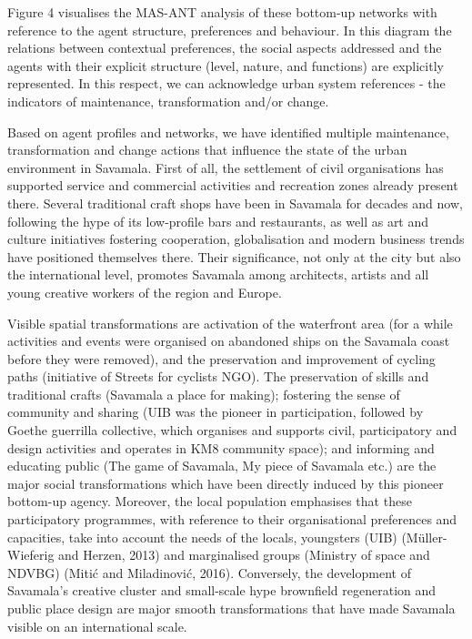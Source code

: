 \documentclass[11pt]{report}
\begin{document}
Figure 4 visualises the MAS-ANT analysis of these bottom-up networks with reference to the agent structure, preferences and behaviour. In this diagram the relations between contextual preferences, the social aspects addressed and the agents with their explicit structure (level, nature, and functions) are explicitly represented. In this respect, we can acknowledge urban system references - the indicators of maintenance, transformation and/or change.

Based on agent profiles and networks, we have identified multiple maintenance, transformation and change actions that influence the state of the urban environment in Savamala. First of all, the settlement of civil organisations has supported service and commercial activities and recreation zones already present there. Several traditional craft shops have been in Savamala for decades and now, following the hype of its low-profile bars and restaurants, as well as art and culture initiatives fostering cooperation, globalisation and modern business trends have positioned themselves there. Their significance, not only at the city but also the international level, promotes Savamala among architects, artists and all young creative workers of the region and Europe.

Visible spatial transformations are activation of the waterfront area (for a while activities and events were organised on abandoned ships on the Savamala coast before they were removed), and the preservation and improvement of cycling paths (initiative of Streets for cyclists NGO). The preservation of skills and traditional crafts (Savamala a place for making); fostering the sense of community and sharing (UIB was the pioneer in participation, followed by Goethe guerrilla collective, which organises and supports civil, participatory and design activities and operates in KM8 community space); and informing and educating public (The game of Savamala, My piece of Savamala etc.) are the major social transformations which have been directly induced by this pioneer bottom-up agency. Moreover, the local population emphasises that these participatory programmes, with reference to their organisational preferences and capacities, take into account the needs of the locals, youngsters (UIB) (Müller-Wieferig and Herzen, 2013) and marginalised groups (Ministry of space and NDVBG) (Mitić and Miladinović, 2016). Conversely, the development of Savamala’s creative cluster and small-scale hype brownfield regeneration and public place design are major smooth transformations that have made Savamala visible on an international scale.
\end{document}
